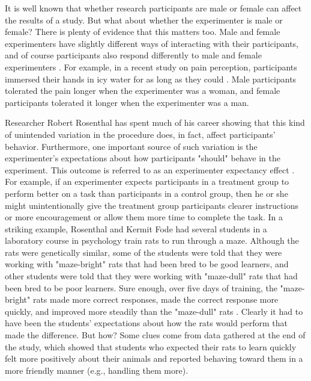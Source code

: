 \color{fgcolor}\begin{kframe}


It is well known that whether research participants are male or female can affect the results of a study. But what about whether the experimenter is male or female? There is plenty of evidence that this matters too. Male and female experimenters have slightly different ways of interacting with their participants, and of course participants also respond differently to male and female experimenters \citep{rosenhan_being_1973}. For example, in a recent study on pain perception, participants immersed their hands in icy water for as long as they could \citep{kallai_effects_2004}. Male participants tolerated the pain longer when the experimenter was a woman, and female participants tolerated it longer when the experimenter was a man.
\end{kframe}

Researcher Robert Rosenthal has spent much of his career showing that this kind of unintended variation in the procedure does, in fact, affect participants' behavior. Furthermore, one important source of such variation is the experimenter's expectations about how participants "should" behave in the experiment. This outcome is referred to as an experimenter expectancy effect \citep{rosenthal_volunteer_1975}. For example, if an experimenter expects participants in a treatment group to perform better on a task than participants in a control group, then he or she might unintentionally give the treatment group participants clearer instructions or more encouragement or allow them more time to complete the task. In a striking example, Rosenthal and Kermit Fode had several students in a laboratory course in psychology train rats to run through a maze. Although the rats were genetically similar, some of the students were told that they were working with "maze-bright" rats that had been bred to be good learners, and other students were told that they were working with "maze-dull" rats that had been bred to be poor learners. Sure enough, over five days of training, the "maze-bright" rats made more correct responses, made the correct response more quickly, and improved more steadily than the "maze-dull" rats \citep{rosenthal_effect_1963}. Clearly it had to have been the students' expectations about how the rats would perform that made the difference. But how? Some clues come from data gathered at the end of the study, which showed that students who expected their rats to learn quickly felt more positively about their animals and reported behaving toward them in a more friendly manner (e.g., handling them more).

